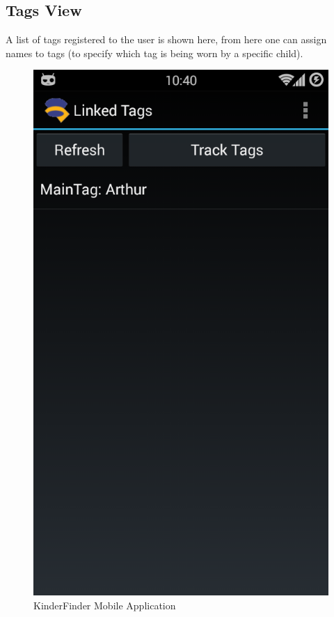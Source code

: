 \documentclass{article}
\begin{document}
\subsection{Tags View}
A list of tags registered to the user is shown here, from here one can assign names to tags (to specify which tag is being worn by a specific child).
\begin{figure}[H]
\centering
\includegraphics[scale=0.4]{Main App - View Tags.png}
\caption{KinderFinder Mobile Application}
\end{figure}
\end{document}
